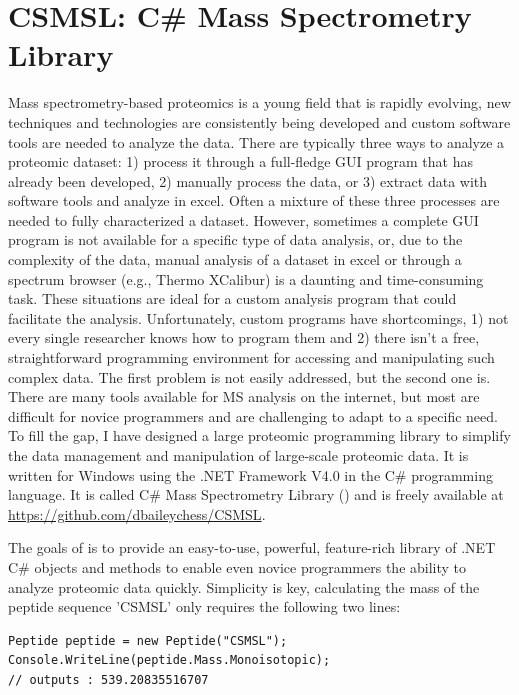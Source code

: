 \section{CSMSL: C\# Mass Spectrometry Library}
Mass spectrometry-based proteomics is a young field that is rapidly evolving, new techniques and technologies are consistently being developed and custom software tools are needed to analyze the data. There are typically three ways to analyze a proteomic dataset: 1) process it through a full-fledge GUI program that has already been developed, 2) manually process the data, or 3) extract data with software tools and analyze in excel. Often a mixture of these three processes are needed to fully characterized a dataset. However, sometimes a complete GUI program is not available for a specific type of data analysis, or, due to the complexity of the data, manual analysis of a dataset in excel or through a spectrum browser (e.g., Thermo XCalibur) is a daunting and time-consuming task. These situations are ideal for a custom analysis program that could facilitate the analysis. Unfortunately, custom programs have shortcomings, 1) not every single researcher knows how to program them and 2) there isn't a free, straightforward programming environment for accessing and manipulating such complex data. The first problem is not easily addressed, but the second one is. There are many tools available for MS analysis on the internet, but most are difficult for novice programmers and are challenging to adapt to a specific need. To fill the gap, I have designed a large proteomic programming library to simplify the data management and manipulation of large-scale proteomic data. It is written for Windows using the .NET Framework V4.0 in the C\# programming language. It is called C\# Mass Spectrometry Library (\csmsl{}) and is freely available at \url{https://github.com/dbaileychess/CSMSL}.

The goals of \csmsl{} is to provide an easy-to-use, powerful, feature-rich library of .NET C\# objects and methods to enable even novice programmers the ability to analyze proteomic data quickly. Simplicity is key, calculating the mass of the peptide sequence 'CSMSL' only requires the following two lines:

\lstset{style=sharpc}
\begin{lstlisting}
Peptide peptide = new Peptide("CSMSL");
Console.WriteLine(peptide.Mass.Monoisotopic);
// outputs : 539.20835516707
\end{lstlisting}

